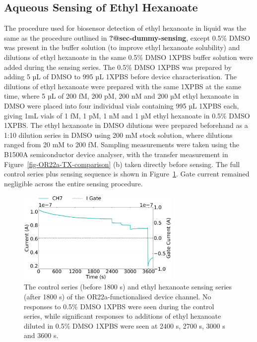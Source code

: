 \documentclass[
  a4paper,
]{scrbook}
\begin{document}
\hypertarget{sec-EtHex-aqueous-sensing}{%
\subsection{Aqueous Sensing of Ethyl
Hexanoate}\label{sec-EtHex-aqueous-sensing}}

The procedure used for biosensor detection of ethyl hexanoate in liquid
was the same as the procedure outlined in \textbf{?@sec-dummy-sensing},
except 0.5\% DMSO was present in the buffer solution (to improve ethyl
hexanoate solubility) and dilutions of ethyl hexanoate in the same 0.5\%
DMSO 1XPBS buffer solution were added during the sensing series. The
0.5\% DMSO 1XPBS was prepared by adding 5 µL of DMSO to 995 µL 1XPBS
before device characterisation. The dilutions of ethyl hexanoate were
prepared with the same 1XPBS at the same time, where 5 µL of 200 fM, 200
pM, 200 nM and 200 µM ethyl hexanoate in DMSO were placed into four
individual vials containing 995 µL 1XPBS each, giving 1mL vials of 1 fM,
1 pM, 1 nM and 1 µM ethyl hexanoate in 0.5\% DMSO 1XPBS. The ethyl
hexanoate in DMSO dilutions were prepared beforehand as a 1:10 dilution
series in DMSO using 200 mM stock solution, where dilutions ranged from
20 mM to 200 fM. Sampling measurements were taken using the B1500A
semiconductor device analyser, with the transfer measurement in
Figure~\ref{fig-OR22a-TX-comparison} (b) taken directly before sensing.
The full control series plus sensing sequence is shown in
Figure~\ref{fig-EtHex-aqueous-sensing}. Gate current remained negligible
across the entire sensing procedure.

\begin{figure}

{\centering \includegraphics[width=0.7\textwidth,height=\textheight]{figures/ch8/Q1C6.png}

}

\caption{\label{fig-EtHex-aqueous-sensing}The control series (before
1800 s) and ethyl hexanoate sensing series (after 1800 s) of the
OR22a-functionalised device channel. No responses to 0.5\% DMSO 1XPBS
were seen during the control series, while significant responses to
additions of ethyl hexanoate diluted in 0.5\% DMSO 1XPBS were seen at
2400 s, 2700 s, 3000 s and 3600 s.}

\end{figure}
\end{document}
